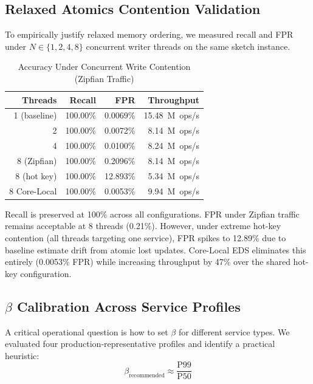 \documentclass[sigconf,nonacm]{acmart}
\begin{document}
\subsection{Relaxed Atomics Contention Validation}

To empirically justify relaxed memory ordering, we measured recall and FPR under
$N \in \{1, 2, 4, 8\}$ concurrent writer threads on the same sketch instance.

\begin{table}[h]
\caption{Accuracy Under Concurrent Write Contention (Zipfian Traffic)}
\label{tab:atomics}
\centering
\small
\begin{tabular}{r r r r}
\toprule
\textbf{Threads} & \textbf{Recall} & \textbf{FPR} & \textbf{Throughput} \\
\midrule
1 (baseline) & 100.00\% & 0.0069\% & 15.48~M~ops/s \\
2            & 100.00\% & 0.0072\% &  8.14~M~ops/s \\
4            & 100.00\% & 0.0100\% &  8.24~M~ops/s \\
8 (Zipfian)  & 100.00\% & 0.2096\% &  8.14~M~ops/s \\
8 (hot key)  & 100.00\% & 12.893\% &  5.34~M~ops/s \\
\midrule
8 Core-Local & 100.00\% & 0.0053\% &  9.94~M~ops/s \\
\bottomrule
\end{tabular}
\end{table}

Recall is preserved at 100\% across all configurations. FPR under
Zipfian traffic remains acceptable at 8 threads (0.21\%). However,
under extreme hot-key contention (all threads targeting one service),
FPR spikes to 12.89\% due to baseline estimate drift from atomic lost
updates. Core-Local EDS eliminates this entirely (0.0053\% FPR) while
increasing throughput by 47\% over the shared hot-key configuration.

\subsection{$\beta$ Calibration Across Service Profiles}

A critical operational question is how to set $\beta$ for different service types. We
evaluated four production-representative profiles and identify a practical heuristic:
\[
  \beta_{\text{recommended}} \approx \frac{\text{P99}}{\text{P50}}
\]
\end{document}
